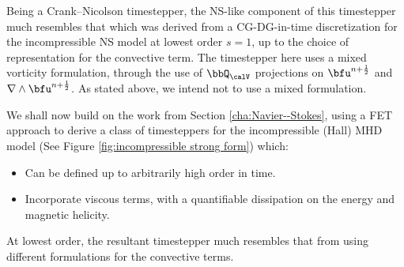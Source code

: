     Being a Crank--Nicolson timestepper, the NS-like component of this timestepper much resembles that which was derived from a CG-DG-in-time discretization for the incompressible NS model at lowest order $s = 1$, up to the choice of representation for the convective term. The timestepper here uses a mixed vorticity formulation, through the use of $\bbQ_{\calV}$ projections on $\bfu^{n + \frac{1}{2}}$ and $\nabla\wedge\bfu^{n + \frac{1}{2}}$. As stated above, we intend not to use a mixed formulation.

    \line

    We shall now build on the work from Section \ref{cha:Navier--Stokes}, using a FET approach to derive a class of timesteppers for the incompressible (Hall) MHD model (See Figure \ref{fig:incompressible strong form}) which:
    \begin{itemize}
        \item  Can be defined up to arbitrarily high order in time.
        \item  Incorporate viscous terms, with a quantifiable dissipation on the energy and magnetic helicity.
    \end{itemize}
    At lowest order, the resultant timestepper much resembles that from \cite{Laakmann_Hu_Farrell_2022} using different formulations for the convective terms.

    \shortline

